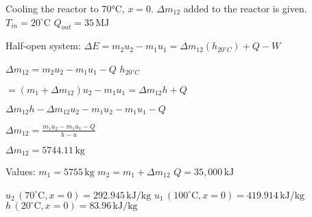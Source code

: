 Cooling the reactor to 70°C, \( x = 0 \).  
\( \Delta m_{12} \) added to the reactor is given.  
\( T_{in} = 20^\circ \text{C} \)  
\( Q_{out} = 35 \, \text{MJ} \)  

Half-open system:  
\( \Delta E = m_2 u_2 - m_1 u_1 = \Delta m_{12} (h_{20°C}) + Q - W \)  

\( \Delta m_{12} = m_2 u_2 - m_1 u_1 - Q \)  
\( h_{20°C} \)  

\( = (m_1 + \Delta m_{12}) u_2 - m_1 u_1 = \Delta m_{12} h + Q \)  

\( \Delta m_{12} h - \Delta m_{12} u_2 - m_1 u_2 - m_1 u_1 - Q \)  

\( \Delta m_{12} = \frac{m_1 u_2 - m_1 u_1 - Q}{h - u} \)  

\( \Delta m_{12} = 5744.11 \, \text{kg} \)  

Values:  
\( m_1 = 5755 \, \text{kg} \)  
\( m_2 = m_1 + \Delta m_{12} \)  
\( Q = 35,000 \, \text{kJ} \)  

\( u_2 \, (70^\circ \text{C}, x = 0) = 292.945 \, \text{kJ/kg} \)  
\( u_1 \, (100^\circ \text{C}, x = 0) = 419.914 \, \text{kJ/kg} \)  
\( h \, (20^\circ \text{C}, x = 0) = 83.96 \, \text{kJ/kg} \)